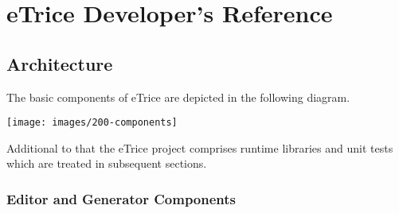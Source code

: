 \chapter{eTrice Developer's Reference}

\section{Architecture}

The basic components of eTrice are depicted in the following diagram.

\texttt{[image: images/200-components]}

Additional to that the eTrice project comprises runtime libraries and unit tests which are treated in subsequent sections.

\subsection{Editor and Generator Components}

